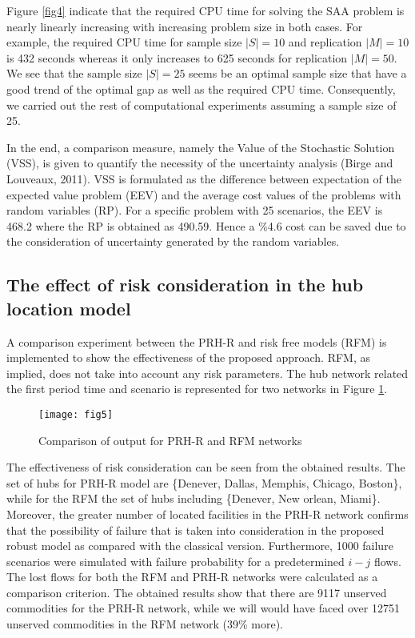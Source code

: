 \documentclass[review]{elsarticle}
\begin{document}
Figure \ref{fig4} indicate that the required CPU time for solving the SAA problem is nearly linearly increasing with increasing problem size in both cases. For example, the required CPU time for sample size $|S|=10$ and replication $|M|=10$ is 432 seconds whereas it only increases to 625 seconds for replication $|M|=50$. We see that the sample size $|S|=25$ seems be an optimal sample size that have a good trend of the optimal gap as well as the required CPU time. Consequently, we carried out the rest of computational experiments assuming a sample size of 25.

In the end, a comparison measure, namely the Value of the Stochastic Solution (VSS), is given to quantify the necessity of the uncertainty analysis (Birge and Louveaux, 2011). VSS is formulated as the difference between expectation of the expected value problem (EEV) and the average cost values of the problems with random variables (RP). For a specific problem with 25 scenarios, the EEV is 468.2 where the RP is obtained as 490.59. Hence a \%4.6 cost can be saved due to the consideration of uncertainty generated by the random variables. 

\subsection{The effect of risk consideration in the hub location model}

A comparison experiment between the PRH-R and risk free models (RFM) is implemented to show the effectiveness of the proposed approach. RFM, as implied, does not take into account any risk parameters. The hub network related the first period time and scenario is represented for two networks in Figure \ref{fig5}.

\begin{figure}[h!]
\centering
\texttt{[image: fig5]}
\caption{Comparison of output for PRH-R and RFM networks}\label{fig5}
\end{figure}

The effectiveness of risk consideration can be seen from the obtained results. The set of hubs for PRH-R model are \{Denever, Dallas, Memphis, Chicago, Boston\}, while for the RFM the set of hubs including \{Denever, New orlean, Miami\}. Moreover, the greater number of located facilities in the PRH-R network confirms that the possibility of failure that is taken into consideration in the proposed robust model as compared with the classical version. Furthermore, 1000 failure scenarios were simulated with failure probability for a predetermined $i-j$ flows. The lost flows for both the RFM and PRH-R networks were calculated as a comparison criterion. The obtained results show that there are 9117 unserved commodities for the PRH-R network, while we will would have faced over 12751 unserved commodities in the RFM network (39\% more). 
\end{document}
